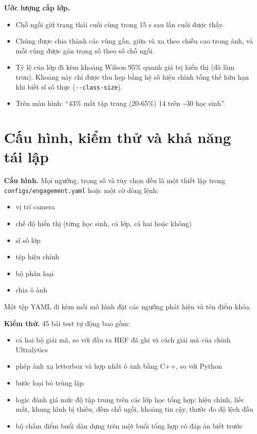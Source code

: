 \textbf{Ước lượng cấp lớp.}

\begin{itemize}
\tightlist
\item
  Chỗ ngồi giữ trạng thái cuối cùng trong 15 s sau lần cuối được thấy.
\item
  Chúng được chia thành các vùng gần, giữa và xa theo chiều cao trong ảnh, và mỗi vùng được gán trọng số theo số chỗ ngồi.
\item
  Tỷ lệ của lớp đi kèm khoảng Wilson 95\% \cite{b16} quanh giá trị hiển thị (đã làm trơn). Khoảng này chỉ được thu hẹp bằng hệ số hiệu chỉnh tổng thể hữu hạn khi biết sĩ số thực (\texttt{-\/-class-size}).
\item
  Trên màn hình: ``43\% mất tập trung (20-65\%) \textbar{} 14 trên \textasciitilde30 học sinh''.
\end{itemize}

\section{Cấu hình, kiểm thử và khả năng tái lập}

\textbf{Cấu hình.} Mọi ngưỡng, trọng số và tùy chọn đều là một thiết lập trong \texttt{configs/engagement.yaml} hoặc một cờ dòng lệnh:

\begin{itemize}
\tightlist
\item
  vị trí camera
\item
  chế độ hiển thị (từng học sinh, cả lớp, cả hai hoặc không)
\item
  sĩ số lớp
\item
  tệp hiệu chỉnh
\item
  bộ phân loại
\item
  chia ô ảnh
\end{itemize}

Một tệp YAML đi kèm mỗi mô hình đặt các ngưỡng phát hiện và tên điểm khóa.

\textbf{Kiểm thử.} 45 bài test tự động bao gồm:

\begin{itemize}
\tightlist
\item
  cả hai bộ giải mã, so với đầu ra HEF đã ghi và cách giải mã của chính Ultralytics
\item
  phép ánh xạ letterbox và hợp nhất ô ảnh bằng C++, so với Python
\item
  bước loại bỏ trùng lặp
\item
  logic đánh giá mức độ tập trung trên các lớp học tổng hợp: hiệu chỉnh, liếc mắt, khung hình bị thiếu, đếm chỗ ngồi, khoảng tin cậy, thước đo độ lệch đầu
\item
  bộ chấm điểm buổi dàn dựng trên một buổi tổng hợp có đáp án biết trước
\end{itemize}

